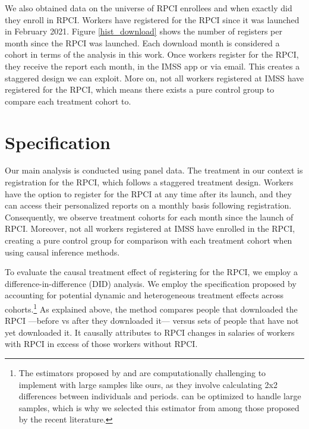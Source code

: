 \documentclass[oneside,11pt]{article}
\begin{document}
We also obtained data on the universe of RPCI enrollees and when exactly did they enroll in RPCI.  Workers have registered for the RPCI since it was launched in February 2021. Figure \ref{hist_download} shows the number of registers per month since the RPCI was launched. Each download month is considered a cohort in terms of the analysis in this work. Once workers register for the RPCI, they receive the report each month, in the IMSS app or via email. This creates a staggered design we can exploit. More on, not all workers registered at IMSS have registered for the RPCI, which means there exists a pure control group to compare each treatment cohort to. 



\section{Specification} \label{specification}

Our main analysis is conducted using panel data. The treatment in our context is registration for the RPCI, which follows a staggered treatment design. Workers have the option to register for the RPCI at any time after its launch, and they can access their personalized reports on a monthly basis following registration. Consequently, we observe treatment cohorts for each month since the launch of RPCI. Moreover, not all workers registered at IMSS have enrolled in the RPCI, creating a pure control group for comparison with each treatment cohort when using causal inference methods. 

To evaluate the causal treatment effect of registering for the RPCI, we employ a difference-in-difference (DID) analysis. We employ the specification proposed by \cite{de2020two} accounting for potential dynamic and heterogeneous treatment effects across cohorts.\footnote{The estimators proposed by \cite{callaway2021difference} and \cite{sun2021estimating} are computationally challenging to implement with large samples like ours, as they involve calculating 2x2 differences between individuals and periods. \cite{de2020two} can be optimized to handle large samples, which is why we selected this estimator from among those proposed by the recent literature.} As explained above, the method compares people that downloaded the RPCI ---before vs after they downloaded it--- versus sets of people that have not yet downloaded it. It causally attributes to RPCI changes in salaries of workers with RPCI in excess of those workers without RPCI.
\end{document}
